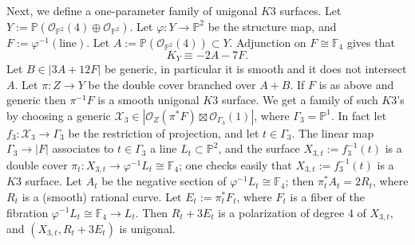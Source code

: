 \documentclass[11pt]{amsart}
\numberwithin{equation}{subsection}
\theoremstyle{plain}
\theoremstyle{remark}
\theoremstyle{definition}
\newcommand{\cO}{{\mathscr O}}
\newcommand{\cX}{{\mathscr X}}
\newcommand{\FF}{{\mathbb F}}
\newcommand{\PP}{{\mathbb P}}
\begin{document}
Next, we define a one-parameter family of unigonal $K3$ surfaces. Let $Y:=\PP(\cO_{\PP^2}(4)\oplus\cO_{\PP^2})$. Let $\varphi\colon Y\to\PP^2$ be the structure map, and $F:=\varphi^{-1}(\text{line})$. Let $A:=\PP(\cO_{\PP^2}(4))\subset Y$. Adjunction on $F\cong\FF_4$ gives that 
%
\begin{equation}\label{kappay}
%
K_Y\equiv -2A-7F.
%
\end{equation}
%
Let  $B\in|3A+12F|$ be generic, in particular it is smooth and it does not intersect $A$. Let $\pi\colon Z\to Y$ be the double cover branched over $A+B$. If $F$ is as above and generic then $\pi^{-1}F$ is a smooth unigonal $K3$ surface. We get a family of such $K3$'s by choosing a generic $\cX_3\in |\cO_Z(\pi^{*}F)\boxtimes\cO_{\Gamma_3}(1)|$, where 
$\Gamma_3=\PP^1$. In fact let $f_3\colon\cX_3\to\Gamma_3$ be the restriction of projection, and let  $t\in\Gamma_3$. The linear map $\Gamma_3\to |F|$ associates to $t\in\Gamma_3$ a line $L_t\subset\PP^2$, and 
the surface $X_{3,t}:=f_3^{-1}(t)$ is a double cover $\pi_t\colon X_{3,t}\to \varphi^{-1}L_t\cong\FF_4$; one checks easily that $X_{3,t}:=f_3^{-1}(t)$ is a $K3$ surface. 
Let $A_t$ be the negative section of $\varphi^{-1}L_t\cong\FF_4$; then $\pi_t^{*}A_t=2R_t$, where $R_t$ is a (smooth) rational curve. Let $E_t:=\pi_t^{*}F_t$, where $F_t$ is a fiber of the fibration $\varphi^{-1}L_t\cong\FF_4\to L_t$. Then $R_t+3E_t$ is a polarization of degree $4$ of $X_{3,t}$, and $(X_{3,t},R_t+3E_t)$ is unigonal. 
\end{document}
